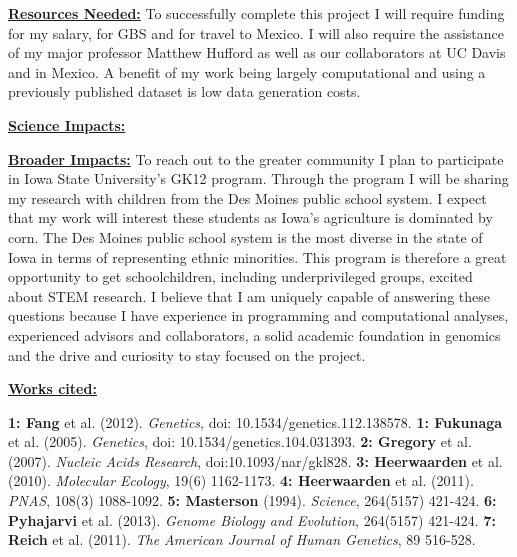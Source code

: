 \documentclass[12pt]{amsart}
\begin{document}
\hfill\break \textbf{\underline{Resources Needed:} } To successfully complete this project I will require funding for my salary, for GBS and for travel to Mexico.  I will also require the assistance of my major professor Matthew Hufford as well as our collaborators at UC Davis and in Mexico.
A benefit of my work being largely computational and using a previously published dataset is low data generation costs.

\hfill\break \textbf{\underline{Science Impacts:} }

\hfill\break \textbf{\underline{Broader Impacts:} }
To reach out to the greater community I plan to participate in Iowa State University's GK12 program.  Through the program I will be sharing my research with children from the Des Moines public school system.  
I expect that my work will interest these students as Iowa's agriculture is dominated by corn.
The Des Moines public school system is the most diverse in the state of Iowa in terms of representing ethnic minorities.  This program is therefore a great opportunity to get schoolchildren, including underprivileged groups, excited about STEM research.  
I believe that I am uniquely capable of answering these questions because I have experience in programming and computational analyses, experienced advisors and collaborators, a solid academic foundation in genomics and the drive and curiosity to stay focused on the project.

\hfill\break \textbf{\underline{Works cited:}}
\small{ 
\textbf{1: Fang} et al. (2012). \textit{Genetics}, doi: 10.1534/genetics.112.138578. 
\textbf{1: Fukunaga} et al. (2005). \textit{Genetics}, doi: 10.1534/genetics.104.031393. 
\textbf{2: Gregory} et al. (2007). \textit{Nucleic Acids Research}, doi:10.1093/nar/gkl828. 
\textbf{3: Heerwaarden} et al. (2010). \textit{Molecular Ecology}, 19(6) 1162-1173. 
\textbf{4: Heerwaarden} et al. (2011). \textit{PNAS}, 108(3) 1088-1092.  
\textbf{5: Masterson} (1994). \textit{Science}, 264(5157) 421-424.  
\textbf{6: Pyhajarvi} et al. (2013). \textit{Genome Biology and Evolution}, 264(5157) 421-424.  
\textbf{7: Reich} et al. (2011). \textit{The American Journal of Human Genetics}, 89 516-528.

}
\end{document}
